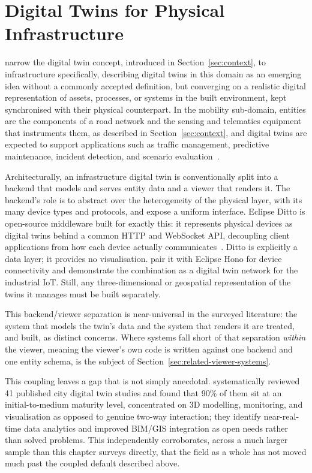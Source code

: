 \section{Digital Twins for Physical Infrastructure}
\label{sec:dt-infrastructure}

\textcite{broo2021digitaltwins} narrow the digital twin concept, introduced in Section~\ref{sec:context}, to infrastructure specifically, describing digital twins in this domain as an emerging idea without a commonly accepted definition, but converging on a realistic digital representation of assets, processes, or systems in the built environment, kept synchronised with their physical counterpart. In the mobility sub-domain, entities are the components of a road network and the sensing and telematics equipment that instruments them, as described in Section~\ref{sec:context}, and digital twins are expected to support applications such as traffic management, predictive maintenance, incident detection, and scenario evaluation~\cite{fuller2020digitaltwin}.

Architecturally, an infrastructure digital twin is conventionally split into a backend that models and serves entity data and a viewer that renders it. The backend's role is to abstract over the heterogeneity of the physical layer, with its many device types and protocols, and expose a uniform interface. Eclipse Ditto is open-source middleware built for exactly this: it represents physical devices as digital twins behind a common HTTP and WebSocket API, decoupling client applications from how each device actually communicates~\cite{kherbache2022ditto}. Ditto is explicitly a data layer; it provides no visualisation. \textcite{kherbache2022ditto} pair it with Eclipse Hono for device connectivity and demonstrate the combination as a digital twin network for the industrial IoT. Still, any three-dimensional or geospatial representation of the twins it manages must be built separately.

This backend/viewer separation is near-universal in the surveyed literature: the system that models the twin's data and the system that renders it are treated, and built, as distinct concerns. Where systems fall short of that separation \emph{within} the viewer, meaning the viewer's own code is written against one backend and one entity schema, is the subject of Section~\ref{sec:related-viewer-systems}.

This coupling leaves a gap that is not simply anecdotal. \textcite{masoumi2023citydigitaltwins} systematically reviewed 41 published city digital twin studies and found that 90\% of them sit at an initial-to-medium maturity level, concentrated on 3D modelling, monitoring, and visualisation as opposed to genuine two-way interaction; they identify near-real-time data analytics and improved BIM/GIS integration as open needs rather than solved problems. This independently corroborates, across a much larger sample than this chapter surveys directly, that the field as a whole has not moved much past the coupled default described above.

